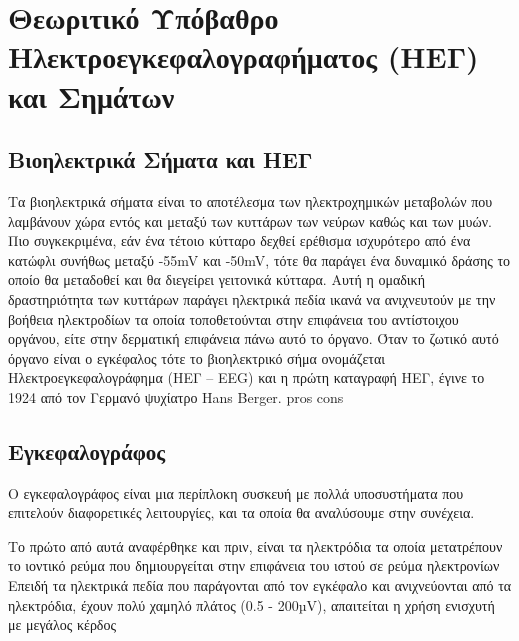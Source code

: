 \documentclass[11pt,a4paper,english,greek,twoside]{../Thesis}
\begin{document}
\chapter{Θεωριτικό Υπόβαθρο Ηλεκτροεγκεφαλογραφήματος (ΗΕΓ) και Σημάτων}
\section{Βιοηλεκτρικά Σήματα και ΗΕΓ}
Τα βιοηλεκτρικά σήματα είναι το αποτέλεσμα των ηλεκτροχημικών μεταβολών που λαμβάνουν χώρα εντός και μεταξύ των κυττάρων των νεύρων καθώς και των μυών. Πιο συγκεκριμένα, εάν ένα τέτοιο κύτταρο δεχθεί ερέθισμα ισχυρότερο από ένα κατώφλι συνήθως μεταξύ  -55mV και -50mV, τότε θα παράγει ένα δυναμικό δράσης το οποίο θα μεταδοθεί και θα διεγείρει γειτονικά κύτταρα. Αυτή η ομαδική δραστηριότητα των κυττάρων παράγει ηλεκτρικά πεδία ικανά να ανιχνευτούν με την βοήθεια ηλεκτροδίων τα οποία τοποθετούνται στην επιφάνεια του αντίστοιχου οργάνου, είτε στην δερματική επιφάνεια πάνω αυτό το όργανο. Όταν το ζωτικό αυτό όργανο είναι ο εγκέφαλος τότε το βιοηλεκτρικό σήμα ονομάζεται Hλεκτροεγκεφαλογράφημα (ΗΕΓ – EEG) και η πρώτη καταγραφή ΗΕΓ, έγινε το 1924 από τον Γερμανό ψυχίατρο Hans Berger. pros cons

\section{Εγκεφαλογράφος}
Ο εγκεφαλογράφος είναι μια περίπλοκη συσκευή με πολλά υποσυστήματα που επιτελούν διαφορετικές λειτουργίες, και τα οποία θα αναλύσουμε στην συνέχεια. \cite{Meng2011ABCI} \cite{Farwell1988TalkingPotentials}

Το πρώτο από αυτά αναφέρθηκε και πριν, είναι τα ηλεκτρόδια τα οποία μετατρέπουν το ιοντικό ρεύμα που δημιουργείται στην επιφάνεια του ιστού σε ρεύμα ηλεκτρονίων
Επειδή τα ηλεκτρικά πεδία που παράγονται από τον εγκέφαλο και ανιχνεύονται από τα ηλεκτρόδια, έχουν πολύ χαμηλό πλάτος (0.5 - 200µV), απαιτείται η χρήση ενισχυτή με μεγάλος κέρδος
   
\end{document}
